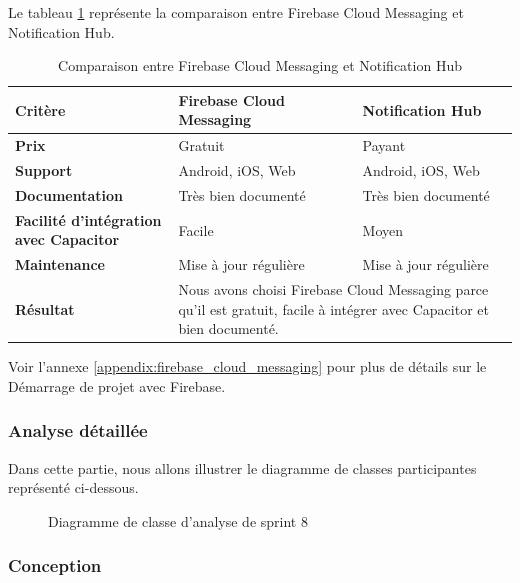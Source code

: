 Le tableau \ref{tab:comparaison_fcm_notification_hub} représente la comparaison entre Firebase Cloud Messaging et Notification Hub.

\begin{longtable}{|p{5cm}|p{5cm}|p{5cm}|}
  \caption{Comparaison entre Firebase Cloud Messaging et Notification Hub} \label{tab:comparaison_fcm_notification_hub} \\
\hline
\textbf{Critère}&\textbf{Firebase Cloud Messaging}&\textbf{Notification Hub}\\
\hline
\textbf{Prix}&Gratuit&Payant\\
\hline
\textbf{Support}&Android, iOS, Web&Android, iOS, Web\\
\hline
\textbf{Documentation}&Très bien documenté&Très bien documenté\\
\hline
\textbf{Facilité d'intégration avec Capacitor}&Facile&Moyen\\
\hline
\textbf{Maintenance}&Mise à jour régulière&Mise à jour régulière\\
\hline
\textbf{Résultat}&\multicolumn{2}{p{10cm}|}{Nous avons choisi Firebase Cloud Messaging parce qu'il est gratuit, facile à intégrer avec Capacitor et bien documenté.}\\
\hline

\end{longtable}

Voir l'annexe \ref{appendix:firebase_cloud_messaging} pour plus de détails sur le Démarrage de projet avec Firebase.



\subsubsection{Analyse détaillée}
Dans cette partie, nous allons illustrer le diagramme de classes participantes représenté ci-dessous.

\setlength{\parskip}{1em}
\setlength{\parindent}{0em}



\begin{figure}[H]
  \centering
  \caption{Diagramme de classe d'analyse de sprint 8}
  \label{fig:class_analyse_sprint8}
\end{figure}


\subsubsection{Conception}

